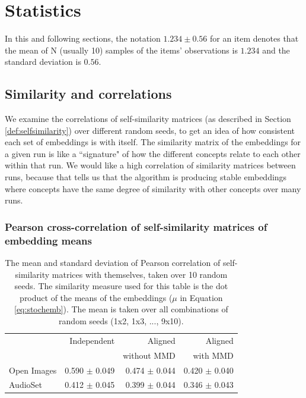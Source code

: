 \newpage
\section{Statistics}


In this and following sections, the notation $1.234 \pm 0.56$ for an item denotes that the mean of N (usually 10) samples of the items' observations is $1.234$ and the standard deviation is $0.56$.


\subsection{Similarity and correlations}
\label{section:similarity}
We examine the correlations of self-similarity matrices (as described in Section \ref{def:selfsimilarity}) over different random seeds, to get an idea of how consistent each set of embeddings is with itself. The similarity matrix of the embeddings for a given run is like a ``signature" of how the different concepts relate to each other within that run. We would like a high correlation of similarity matrices between runs, because that tells us that the algorithm is producing stable embeddings where concepts have the same degree of similarity with other concepts over many runs. 

\subsubsection{Pearson cross-correlation of self-similarity matrices of embedding means}

\begin{table}[H]
\centering
\begin{tabular}{lrrr}
\toprule
       &   Independent & Aligned     &  Aligned  \\
       &               & without MMD &  with MMD \\
\midrule
Open Images    & 0.590 $\pm$ 0.049 & 0.474 $\pm$ 0.044 &     0.420 $\pm$  0.040 \\
AudioSet    & 0.412 $\pm$ 0.045 &  0.399 $\pm$ 0.044  &      0.346  $\pm$ 0.043  \\
\bottomrule
\end{tabular}
\caption{\label{table:corrmeans}The mean and standard deviation of Pearson correlation of self-similarity matrices with themselves, taken over 10 random seeds. The similarity measure used for this table is the dot product of the means of the embeddings ($\mu$ in Equation \ref{eq:stochemb}). The mean is taken over all combinations of random seeds (1x2, 1x3, ..., 9x10).}
\end{table}


